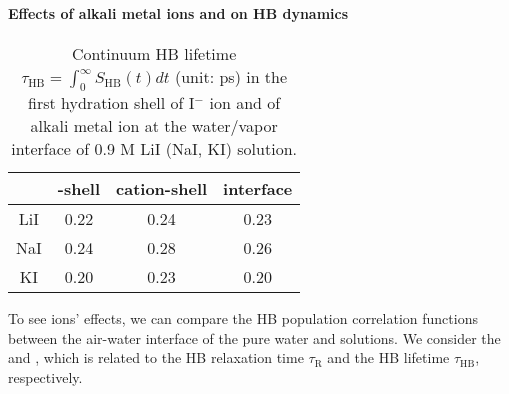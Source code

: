 \paragraph{Effects of alkali metal ions and \I on HB dynamics}
\begin{table}[H]
\centering
\caption{\label{tab:tau_hb_alkali_iodine} 
Continuum HB lifetime $\tau_{\text{HB}}=\int_0^\infty S_\text{HB}(t) dt$ (unit: ps) in the first hydration shell of I$^-$ ion 
and of alkali metal ion at the water/vapor interface of 0.9 M LiI (NaI, KI) solution.}
\begin{tabular}{cccc}
  &\I-shell &cation-shell& interface \\
\hline
 LiI & 0.22 & 0.24 & 0.23\\
 NaI & 0.24 & 0.28 & 0.26\\
 KI  & 0.20 & 0.23 & 0.20\\
\end{tabular}
\end{table} 

To see ions' effects, we can compare the HB population correlation functions between the air-water interface of the pure water and solutions.
We consider the \CHB and \SHB, which is related to the HB relaxation time $\tau_\text{R}$ and the HB lifetime $\tau_\text{HB}$, respectively.

